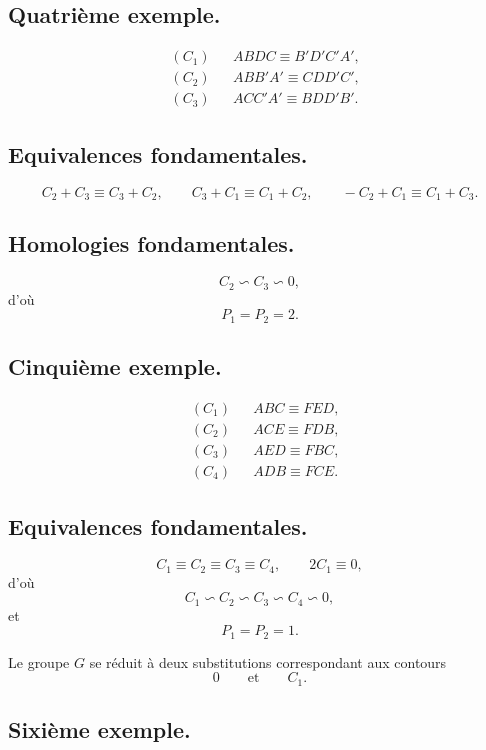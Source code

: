 \documentclass{article}
\begin{document}
\subsection*{Quatrième exemple.}

\[ \begin{aligned} &(C_{1}) &&ABDC \equiv B'D'C'A',\\ &(C_{2}) &&ABB'A' \equiv CDD'C',\\ &(C_{3}) &&ACC'A' \equiv BDD'B'. \end{aligned} \]

\subsection*{Equivalences fondamentales.}

\[ C_{2} + C_{3} \equiv C_{3} + C_{2}, \qquad C_{3} + C_{1} \equiv C_{1} + C_{2}, \qquad -C_{2} + C_{1} \equiv C_{1} + C_{3}. \]

\subsection*{Homologies fondamentales.}

\[ C_{2} \backsim C_{3} \backsim 0, \]
d'où
\[ P_{1} = P_{2} = 2. \]

\subsection*{Cinquième exemple.}

\[ \begin{aligned} &(C_{1}) &&ABC \equiv FED,\\ &(C_{2}) &&ACE \equiv FDB,\\ &(C_{3}) &&AED \equiv FBC,\\ &(C_{4}) &&ADB \equiv FCE. \end{aligned} \]

\subsection*{Equivalences fondamentales.}

\[ C_{1} \equiv C_{2} \equiv C_{3} \equiv C_{4}, \qquad 2C_{1} \equiv 0, \]
d'où
\[ C_{1} \backsim C_{2} \backsim C_{3} \backsim C_{4} \backsim 0, \]
et
\[ P_{1} = P_{2} = 1. \]

Le groupe $G$ se réduit à deux substitutions correspondant aux contours
\[ 0 \qquad \text{et} \qquad C_{1}. \]

\subsection*{Sixième exemple.}
\end{document}
